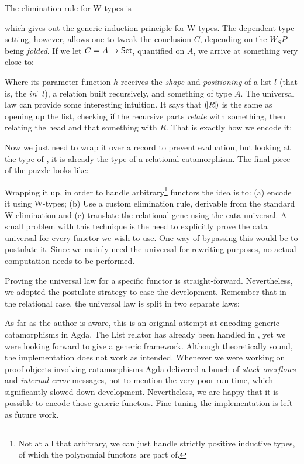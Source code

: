 The elimination rule for W-types is


which gives out the generic induction principle for W-types. The dependent type setting, however, allows
one to tweak the conclusion $C$, depending on the $W_S P$ being \emph{folded}. If we let
$C = A \rightarrow \D{Set}$, quantified on $A$, we arrive at something very close to:


Where its parameter function $h$ receives the \emph{shape} and \emph{positioning} of a list $l$
(that is, the $in^\circ\;l$), a relation built recursively, and something of type $A$.
The universal law can provide some interesting intuition. It says that $\mathopen{(\!|}R\mathclose{|\!)}$ is
the same as opening up the list, checking if the recursive parts \emph{relate} with something,
then relating the head and that something with $R$. That is exactly how we encode it:


Now we just need to wrap it over a record to prevent evaluation, but looking at the type
of , it is already the type of a relational catamorphism. The final piece of the puzzle looks like:


Wrapping it up, in order to handle arbitrary\footnote{
Not at all that arbitrary, we can just handle strictly positive inductive types, of which
the polynomial functors are part of.
} functors the idea is to: (a) encode it using W-types; (b) Use a custom elimination rule, derivable
from the standard W-elimination and (c) translate the relational gene using the cata universal. 
A small problem with this technique is the need to explicitly prove the cata universal for
every functor we wish to use. One way of bypassing this would be to postulate it. Since
we mainly need the universal for rewriting purposes, no actual computation needs to be performed.

Proving the universal law for a specific functor is straight-forward. Nevertheless, we adopted
the postulate strategy to ease the development. Remember that in the relational case, the universal
law is split in two separate laws:


As far as the author is aware, this is an original attempt at encoding generic catamorphisms
in Agda. The List relator has already been handled in \cite{Jansson09}, yet we were looking
forward to give a generic framework. Although theoretically sound, the implementation does
not work as intended. Whenever we were working on proof objects involving catamorphisms
Agda delivered a bunch of \emph{stack overflows} and \emph{internal error} messages, not to
mention the very poor run time, which significantly slowed down development. Nevertheless,
we are happy that it is possible to encode those generic functors. Fine tuning the implementation
is left as future work.


